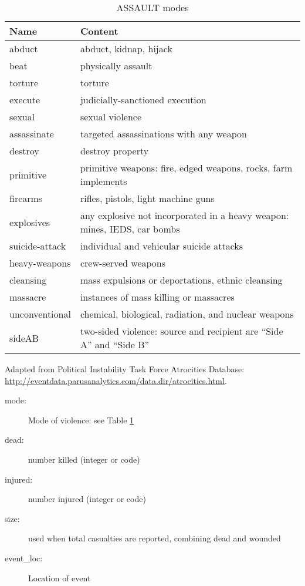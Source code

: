 \documentclass[11pt]{report}
\begin{document}
\begin{table}[htp]
\caption{ASSAULT modes}
\begin{center}
\begin{tabular}{|l|l|}
\hline
Name & Content \\
\hline
abduct & abduct, kidnap, hijack \\
beat & physically assault \\
torture & torture \\
execute & judicially-sanctioned execution\\
sexual & sexual violence\\
assassinate & targeted assassinations with any weapon \\
destroy & destroy property \\
primitive & primitive weapons: fire, edged weapons, rocks, farm implements \\
firearms & rifles, pistols, light machine guns\\
explosives & any explosive not incorporated in a heavy weapon: mines, IEDS, car bombs \\
suicide-attack & individual and vehicular suicide attacks \\
heavy-weapons & crew-served weapons  \\
cleansing & mass expulsions or deportations, ethnic cleansing  \\
massacre & instances of mass killing or massacres  \\
unconventional & chemical, biological, radiation, and nuclear weapons  \\
sideAB & two-sided violence: source and recipient are ``Side A'' and ``Side B'' \\
\hline
\end{tabular}
\end{center}
\label{tab:violmode}
\raggedright{Adapted from Political Instability Task Force Atrocities Database: \url{http://eventdata.parusanalytics.com/data.dir/atrocities.html}}. 
\end{table}%

\begin{description}
	\item[mode:] Mode of violence: see Table \ref{tab:violmode} 
	\item[dead:]  number killed (integer or code) 
	\item[injured:] number injured (integer or code) 
	\item[size:] used when total casualties are reported, combining dead and wounded 
	\item[event\_loc:] Location of event 
\end{description}
\end{document}
